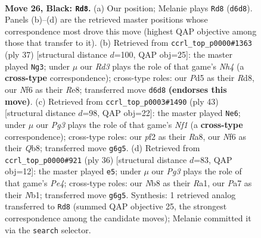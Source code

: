 \documentclass[11pt]{article}
\begin{document}
\clearpage

\begin{figure}[p]\centering
\begin{subfigure}{0.46\textwidth}\centering
\resizebox{\linewidth}{!}{%
\newchessgame
\chessboard[
  setfen={rnb5/pp2qpbk/3rpnp1/P2p3p/B2P3P/4B1P1/RPPNQP2/1N2R1K1 b - - 6 26},
  showmover=false,
  pgfstyle=straightmove, color=movearrow, markmove={d6-d8}
]}
\caption{}
\end{subfigure}\hfill
\begin{subfigure}{0.46\textwidth}\centering
\resizebox{\linewidth}{!}{%
\newchessgame
\chessboard[
  setfen={3rr1k1/ppq3p1/4bp1p/n2p3n/2pP4/P1P1PP1P/2B1RNP1/1RBQ2K1 b - - 1 19},
  showmover=false,
  pgfstyle=straightmove, color=movearrow, markmove={h5-g3}
]}
\caption{}
\end{subfigure}
\\[4pt]
\begin{subfigure}{0.46\textwidth}\centering
\resizebox{\linewidth}{!}{%
\newchessgame
\chessboard[
  setfen={rq1b1nk1/1b2rppp/5n2/pB2p3/Np2P3/1P1QB1PP/P2N1P2/2R1R1K1 b - - 7 22},
  showmover=false,
  pgfstyle=straightmove, color=movearrow, markmove={f8-e6}
]}
\caption{}
\end{subfigure}\hfill
\begin{subfigure}{0.46\textwidth}\centering
\resizebox{\linewidth}{!}{%
\newchessgame
\chessboard[
  setfen={3rr1k1/pq1nbpp1/b1p1p2p/Pp6/1n1PP3/1P3NP1/1Q3PBP/RN1RB1K1 w - - 3 19},
  showmover=false,
  pgfstyle=straightmove, color=movearrow, markmove={e4-e5}
]}
\caption{}
\end{subfigure}
\caption{\textbf{Move 26, Black: \texttt{Rd8}.} (a) Our position; Melanie plays \texttt{Rd8} (\texttt{d6d8}). Panels (b)--(d) are the retrieved master positions whose correspondence most drove this move (highest QAP objective among those that transfer to it). (b) Retrieved from \texttt{ccrl\_top\_p0000\#1363} (ply 37) [structural distance $d$=100, QAP obj=25]: the master played \texttt{Ng3}; under $\mu$ our \emph{Rd3} plays the role of that game's \emph{Nh4} (a \textbf{cross-type} correspondence); cross-type roles: our \emph{P}d5 as their \emph{R}d8, our \emph{N}f6 as their \emph{R}e8; transferred move \texttt{d6d8} \textbf{(endorses this move)}. (c) Retrieved from \texttt{ccrl\_top\_p0003\#1490} (ply 43) [structural distance $d$=98, QAP obj=22]: the master played \texttt{Ne6}; under $\mu$ our \emph{Pg3} plays the role of that game's \emph{Nf1} (a \textbf{cross-type} correspondence); cross-type roles: our \emph{p}f2 as their \emph{R}a8, our \emph{N}f6 as their \emph{Q}b8; transferred move \texttt{g6g5}. (d) Retrieved from \texttt{ccrl\_top\_p0000\#921} (ply 36) [structural distance $d$=83, QAP obj=12]: the master played \texttt{e5}; under $\mu$ our \emph{Pg3} plays the role of that game's \emph{Pe4}; cross-type roles: our \emph{N}b8 as their \emph{R}a1, our \emph{P}a7 as their \emph{N}b1; transferred move \texttt{g6g5}. Synthesis: 1 retrieved analog transferred to \texttt{Rd8} (summed QAP objective 25, the strongest correspondence among the candidate moves); Melanie committed it via the \texttt{search} selector.}
\label{fig:thought-m51}
\end{figure}
\end{document}
